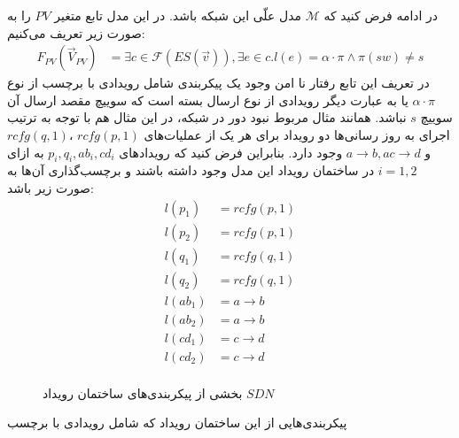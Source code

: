 \documentclass[
msc,
irfonts
]{./tex/tehran-thesis}
\newcommand{\پ}{پروژه/پایان‌نامه/رساله }
\theoremstyle{definition}
\theoremstyle{theorem}
\theoremstyle{definition}
\numberwithin{algorithm}{chapter}
\newcommand{\s}[1]{\{#1\}}
\newcommand{\ra}{\rightarrow}
\newcommand{\crd}[4][above]{
    \node[draw,circle,inner sep=2pt,fill,label={[#1]:#4}] at (#2,#3) {};
}
\newcommand{\mc}[1]{\mathcal{#1}}
\newcommand{\f}[1]{F_{#1}(\vec V_{#1})}
\begin{document}
در ادامه فرض کنید که 
$\mc{M}$
مدل علّی این شبکه باشد.
در این مدل تابع متغیر
$PV$
را به صورت زیر تعریف می‌کنیم:
\begin{align*}
    \f{PV} & = \exists c \in \mathcal{F}(ES(\vec v)),
    \exists e \in c. l(e) =  \alpha\cdot\pi \wedge \pi(sw) \neq s
\end{align*}
در تعریف این تابع رفتار نا امن وجود یک پیکربندی شامل رویدادی با برچسب از نوع 
$\alpha \cdot \pi$
یا به عبارت دیگر رویدادی از نوع ارسال بسته است که سوییچ مقصد ارسال آن سوییچ 
$s$
نباشد.
همانند مثال مربوط نبود دور در شبکه، در این مثال هم با توجه به ترتیب اجرای به روز رسانی‌ها دو رویداد برای هر یک از عملیات‌های 
$rcfg(p,1)$
،$rcfg(q,1)$
و
$a\ra b,a c\ra d$
وجود دارد. 
بنابراین فرض کنید که رویدادهای
$p_i,q_i,ab_i,cd_i$
به ازای 
$i=1,2$
در ساختمان رویداد این مدل وجود داشته باشند و برچسب‌گذاری آن‌ها به صورت زیر باشد:
\begin{align*}
    l(p_1) & = rcfg(p,1) \\
    l(p_2) & = rcfg(p,1) \\
    l(q_1) & = rcfg(q,1) \\
    l(q_2) & = rcfg(q,1) \\
    l(ab_1) & = a \ra b \\
    l(ab_2) & = a \ra b \\
    l(cd_1) & = c \ra d \\
    l(cd_2) & = c \ra d \\
\end{align*}
\begin{figure}
    \centering
    \caption{
        بخشی از پیکربندی‌های ساختمان رویداد
        $SDN$
    }
    \label{fig:blackhole:es}
\end{figure}
پیکربندی‌هایی از این ساختمان رویداد که شامل رویدادی با برچسب 
\end{document}

